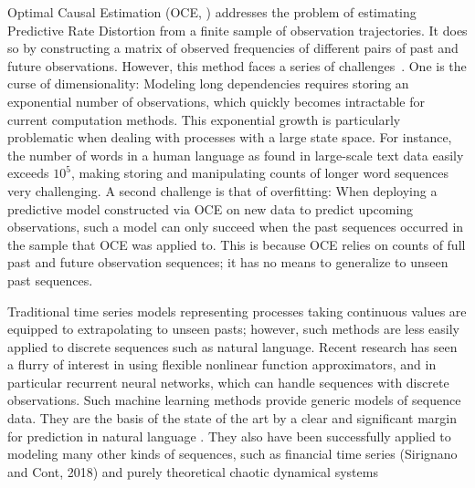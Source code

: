 \documentclass[11pt,letterpaper]{article}
\begin{document}
Optimal Causal Estimation (OCE, \citet{still-optimal-2010}) addresses the problem of estimating Predictive Rate Distortion from a finite sample of observation trajectories.
It does so by constructing a matrix of observed frequencies of different pairs of past and future observations.
However, this method faces a series of challenges~\citep{marzen-predictive-2016}.
One is the curse of dimensionality:
Modeling long dependencies requires storing an exponential number of observations, which quickly becomes intractable for current computation methods.
This exponential growth is particularly problematic when dealing with processes with a large state space.
For instance, the number of words in a human language as found in large-scale text data easily exceeds $10^5$, making storing and manipulating counts of longer word sequences very challenging.
A second challenge is that of overfitting:
When deploying a predictive model constructed via OCE on new data to predict upcoming observations, such a model can only succeed when the past sequences occurred in the sample that OCE was applied to.
This is because OCE relies on counts of full past and future observation sequences; it has no means to generalize to unseen past sequences.

Traditional time series models representing processes taking continuous values are equipped to extrapolating to unseen pasts; however, such methods are less easily applied to discrete sequences such as natural language.
Recent research has seen a flurry of interest in using flexible nonlinear function approximators, and in particular recurrent neural networks, which can handle sequences with discrete observations.
Such machine learning methods provide generic models of sequence data.
They are the basis of the state of the art by a clear and significant margin for prediction in natural language \citep{DBLP:journals/corr/JozefowiczVSSW16, merity2018analysis, dai2019transformer,takahashi2018cross}.
They also have been successfully applied to modeling many other kinds of sequences, such as financial time series (Sirignano and Cont, 2018) and purely theoretical chaotic dynamical systems~\citep{ogunmolu2016nonlinear,laptev2017time,zhu2017deep,meyer2018survey,hundman2018detecting,white2018forecasting,woo2018dynamic,mohajerin2019multistep,hagge2017solving,sirignano2018universal}
\end{document}
